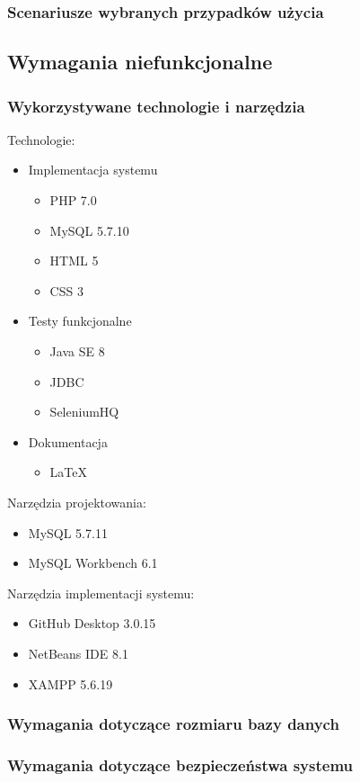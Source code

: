 \documentclass[a4paper, 12pt]{article}
\begin{document}
\subsubsection{Scenariusze wybranych przypadków użycia}

\subsection{Wymagania niefunkcjonalne}
\subsubsection{Wykorzystywane technologie i narzędzia}
Technologie:
\begin{itemize}
	\item Implementacja systemu
	\begin{itemize}
		\item PHP 7.0
		\item MySQL 5.7.10
		\item HTML 5
		\item CSS 3
	\end{itemize}
	\item Testy funkcjonalne
	\begin{itemize}
		\item Java SE 8
		\item JDBC
		\item SeleniumHQ
	\end{itemize}
	\item Dokumentacja
	\begin{itemize}
		\item LaTeX
	\end{itemize}
\end{itemize}
Narzędzia projektowania:
\begin{itemize}
	\item MySQL 5.7.11
	\item MySQL Workbench 6.1
\end{itemize}
Narzędzia implementacji systemu:
\begin{itemize}
	\item GitHub Desktop 3.0.15
	\item NetBeans IDE 8.1
	\item XAMPP 5.6.19
\end{itemize}
\subsubsection{Wymagania dotyczące rozmiaru bazy danych}
\subsubsection{Wymagania dotyczące bezpieczeństwa systemu}
\end{document}
